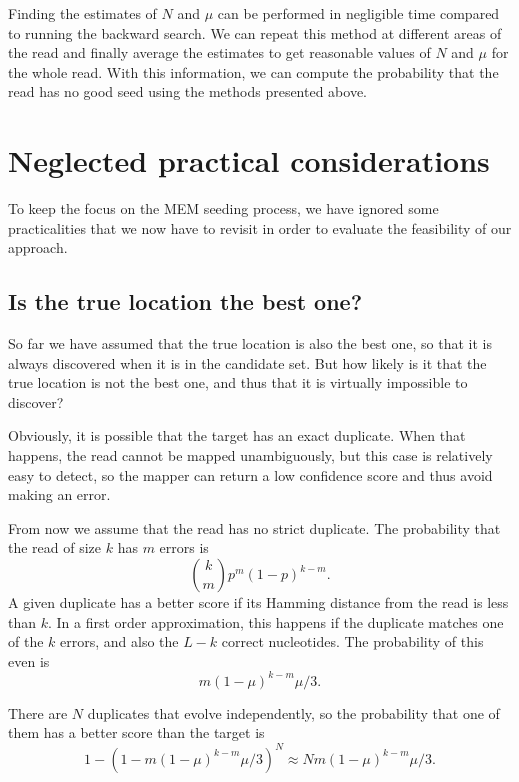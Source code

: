\documentclass{article}
\begin{document}
Finding the estimates of $N$ and $\mu$ can be performed in negligible time
compared to running the backward search. We can repeat this method at
different areas of the read and finally average the estimates to get
reasonable values of $N$ and $\mu$ for the whole read. With this
information, we can compute the probability that the read has no good seed
using the methods presented above.

\section{Neglected practical considerations}

To keep the focus on the MEM seeding process, we have ignored some
practicalities that we now have to revisit in order to evaluate the
feasibility of our approach.

\subsection{Is the true location the best one?}
\label{sec:not_the_best}

So far we have assumed that the true location is also the best one, so
that it is always discovered when it is in the candidate set. But how
likely is it that the true location is not the best one, and thus that it
is virtually impossible to discover?

Obviously, it is possible that the target has an exact duplicate. When
that happens, the read cannot be mapped unambiguously, but this case is
relatively easy to detect, so the mapper can return a low confidence score
and thus avoid making an error.

From now we assume that the read has no strict duplicate. The probability
that the read of size $k$ has $m$ errors is
\begin{equation*}
{k \choose m}p^m(1-p)^{k-m}.
\end{equation*} 
A given duplicate has a better score if its Hamming distance from the read
is less than $k$. In a first order approximation, this happens if the
duplicate matches one of the $k$ errors, and also the $L-k$ correct
nucleotides. The probability of this even is
\begin{equation*}
m(1-\mu)^{k-m}\mu/3.
\end{equation*}

There are $N$ duplicates that evolve independently, so the probability
that one of them has a better score than the target is
\begin{equation*}
1-\left(1-m(1-\mu)^{k-m}\mu/3\right)^N \approx Nm(1-\mu)^{k-m}\mu/3.
\end{equation*}
\end{document}
